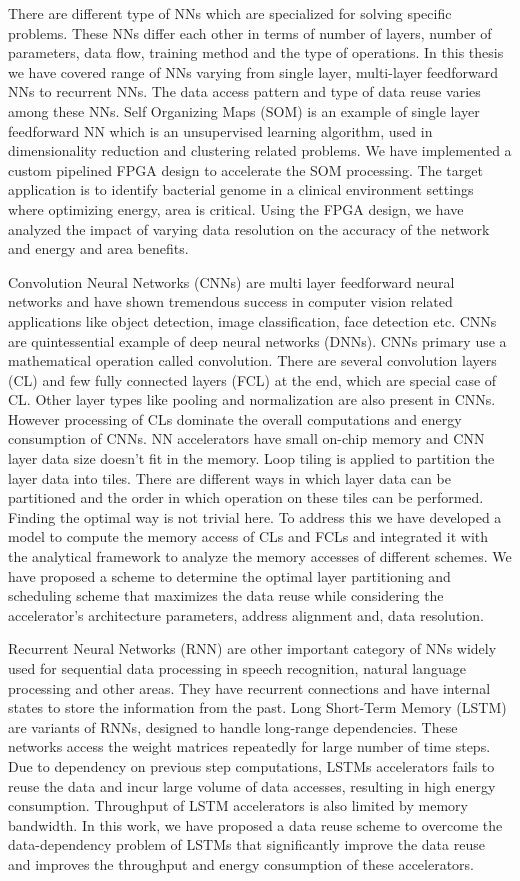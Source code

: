There are different type of NNs which are specialized for solving specific problems. These NNs differ each other in terms of number of layers, number of parameters, data flow, training method and the type of operations. In this thesis we have covered range of NNs varying from single layer, multi-layer feedforward NNs to recurrent NNs. The data access pattern and type of data reuse varies among these NNs. Self Organizing Maps (SOM) is an example of single layer feedforward NN which is an unsupervised learning algorithm, used in dimensionality reduction and clustering related problems. We have implemented a custom pipelined FPGA design to accelerate the SOM processing. The target application is to identify bacterial genome in a clinical environment settings where optimizing energy, area is critical. Using the FPGA design, we have analyzed the impact of varying data resolution on the accuracy of the network and energy and area benefits. 

Convolution Neural Networks (CNNs) are multi layer feedforward neural networks and have shown tremendous success in computer vision related applications like object detection, image classification, face detection etc. CNNs are quintessential example of deep neural networks (DNNs). CNNs primary use a mathematical operation called convolution. There are several convolution layers (CL) and few fully connected layers (FCL) at the end, which are special case of CL. Other layer types like pooling and normalization are also present in CNNs. However processing of CLs dominate the overall computations and energy consumption of CNNs. NN accelerators have small on-chip memory and CNN layer data size doesn't fit in the memory. Loop tiling is applied to partition the layer data into tiles. There are different ways in which layer data can be partitioned and the order in which operation on these tiles can be performed. Finding the optimal way is not trivial here. To address this we have developed a model to compute the memory access of CLs and FCLs and integrated it with the analytical framework to analyze the memory accesses of different schemes. We have proposed a scheme to determine the optimal layer partitioning and scheduling scheme that maximizes the data reuse while considering the accelerator's architecture parameters, address alignment and, data resolution.

Recurrent Neural Networks (RNN) are other important category of NNs widely used for sequential data processing in speech recognition, natural language processing and other areas. They have recurrent connections and have internal states to store the information from the past. Long Short-Term Memory (LSTM) are variants of RNNs, designed to handle long-range dependencies. These networks access the weight matrices repeatedly for large number of time steps. Due to dependency on previous step computations, LSTMs accelerators fails to reuse the data and incur large volume of data accesses, resulting in high energy consumption. Throughput of LSTM accelerators is also limited by memory bandwidth. In this work, we have proposed a data reuse scheme to overcome the data-dependency problem of LSTMs that significantly improve the data reuse and improves the throughput and energy consumption of these accelerators.

